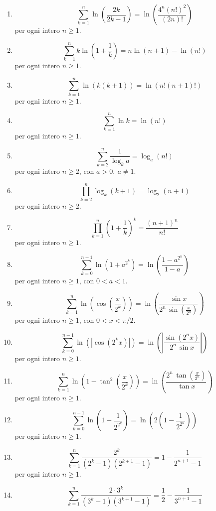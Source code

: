 \documentclass[11pt,a4paper]{article}
\begin{document}
\begin{enumerate}
{\small per ogni intero $n\ge 1$.}
\item \[ \sum_{k=1}^{n} \ln\left(\frac{2k}{2k - 1}\right) = \ln\left(\frac{4^{n}\left(n!\right)^{2}}{\left(2n\right)!}\right) \]
{\small per ogni intero $n\ge 1$.}
\item \[ \sum_{k=1}^{n} k\ln\left(1 + \frac{1}{k}\right) = n\ln\left(n + 1\right) - \ln\left(n!\right) \]
{\small per ogni intero $n\ge 1$.}
\item \[ \sum_{k=1}^{n} \ln\left(k\left(k + 1\right)\right) = \ln\left(n!\left(n + 1\right)!\right) \]
{\small per ogni intero $n\ge 1$.}
\item \[ \sum_{k=1}^{n} \ln k = \ln\left(n!\right) \]
{\small per ogni intero $n\ge 1$.}
\item \[ \sum_{k=2}^{n} \frac{1}{\log_{k} a} = \log_{a}\left(n!\right) \]
{\small per ogni intero $n\ge 2$, con $a>0,\ a\neq1$.}
\item \[ \prod_{k=2}^{n} \log_{k}\left(k + 1\right) = \log_{2}\left(n + 1\right) \]
{\small per ogni intero $n\ge 2$.}
\item \[ \prod_{k=1}^{n} \left(1 + \frac{1}{k}\right)^{k} = \frac{\left(n + 1\right)^{n}}{n!} \]
{\small per ogni intero $n\ge 1$.}
\item \[ \sum_{k=0}^{n - 1} \ln\left(1 + a^{2^{k}}\right) = \ln\left(\frac{1 - a^{2^{n}}}{1 - a}\right) \]
{\small per ogni intero $n\ge 1$, con $0<a<1$.}
\item \[ \sum_{k=1}^{n} \ln\left(\cos\left(\frac{x}{2^{k}}\right)\right) = \ln\left(\frac{\sin x}{2^{n}\,\sin\left(\frac{x}{2^{n}}\right)}\right) \]
{\small per ogni intero $n\ge 1$, con $0<x<\pi/2$.}
\item \[ \sum_{k=0}^{n - 1} \ln\left(\left|\cos\left(2^{k}x\right)\right|\right) = \ln\left(\left|\frac{\sin\left(2^{n}x\right)}{2^{n}\,\sin x}\right|\right) \]
{\small per ogni intero $n\ge 1$.}
\item \[ \sum_{k=1}^{n} \ln\left(1 - \tan^{2}\left(\frac{x}{2^{k}}\right)\right) = \ln\left(\frac{2^{n}\,\tan\left(\frac{x}{2^{n}}\right)}{\tan x}\right) \]
{\small per ogni intero $n\ge 1$.}
\item \[ \sum_{k=0}^{n - 1} \ln\left(1 + \frac{1}{2^{2^{k}}}\right) = \ln\left(2\left(1 - \frac{1}{2^{2^{n}}}\right)\right) \]
{\small per ogni intero $n\ge 1$.}
\item \[ \sum_{k=1}^{n} \frac{2^{k}}{\left(2^{k} - 1\right)\left(2^{k + 1} - 1\right)} = 1 - \frac{1}{2^{n + 1} - 1} \]
{\small per ogni intero $n\ge 1$.}
\item \[ \sum_{k=1}^{n} \frac{2 \cdot 3^{k}}{\left(3^{k} - 1\right)\left(3^{k + 1} - 1\right)} = \frac{1}{2} - \frac{1}{3^{n + 1} - 1} \]

\end{enumerate}
\end{document}
